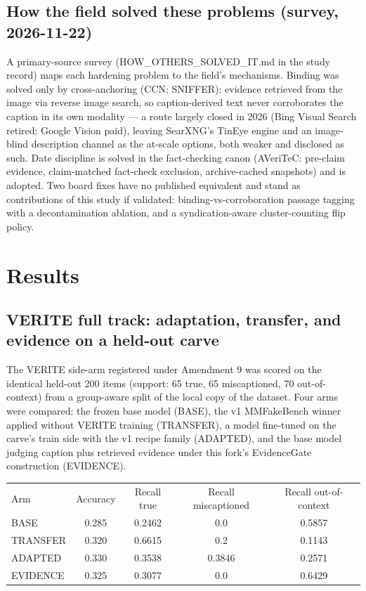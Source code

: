 \documentclass{article}
\begin{document}
\subsection{How the field solved these problems (survey, 2026-11-22)}
A primary-source survey (HOW\_OTHERS\_SOLVED\_IT.md in the study record) maps each
hardening problem to the field's mechanisms. Binding was solved only by
cross-anchoring (CCN; SNIFFER): evidence retrieved from the image via reverse
image search, so caption-derived text never corroborates the caption in its own
modality --- a route largely closed in 2026 (Bing Visual Search retired;
Google Vision paid), leaving SearXNG's TinEye engine and an image-blind
description channel as the at-scale options, both weaker and disclosed as such.
Date discipline is solved in the fact-checking canon (AVeriTeC: pre-claim
evidence, claim-matched fact-check exclusion, archive-cached snapshots) and is
adopted. Two board fixes have no published equivalent and stand as contributions
of this study if validated: binding-vs-corroboration passage tagging with a
decontamination ablation, and a syndication-aware cluster-counting flip policy.
\section{Results}
\subsection{VERITE full track: adaptation, transfer, and evidence on a held-out carve}
The VERITE side-arm registered under Amendment 9 was scored on the
identical held-out 200 items (support: 65 true, 65 miscaptioned,
70 out-of-context) from a group-aware split of the local copy of the
dataset. Four arms were compared: the frozen base model (BASE), the
v1 MMFakeBench winner applied without VERITE training (TRANSFER), a
model fine-tuned on the carve's train side with the v1 recipe family
(ADAPTED), and the base model judging caption plus retrieved evidence
under this fork's EvidenceGate construction (EVIDENCE).

\begin{center}
\begin{tabular}{lcccc}
Arm & Accuracy & Recall true & Recall miscaptioned & Recall out-of-context \\
BASE & 0.285 & 0.2462 & 0.0 & 0.5857 \\
TRANSFER & 0.320 & 0.6615 & 0.2 & 0.1143 \\
ADAPTED & 0.330 & 0.3538 & 0.3846 & 0.2571 \\
EVIDENCE & 0.325 & 0.3077 & 0.0 & 0.6429 \\
\end{tabular}
\end{center}
\end{document}
